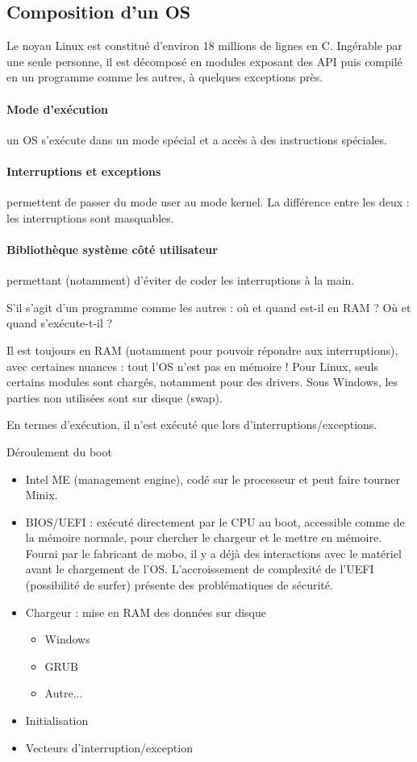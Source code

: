 \documentclass[11pt]{article}
\begin{document}
\subsection{Composition d'un OS}
Le noyau Linux est constitué d'environ 18 millions de lignes en C. Ingérable par une seule personne, il est décomposé en modules exposant des API puis compilé en un programme comme les autres, à quelques exceptions près.

\paragraph{Mode d'exécution} un OS s'exécute dans un mode spécial et a accès à des instructions spéciales. 

\paragraph{Interruptions et exceptions} permettent de passer du mode user au mode kernel. La différence entre les deux : les interruptions sont masquables.

\paragraph{Bibliothèque système côté utilisateur} permettant (notamment) d'éviter de coder les interruptions à la main.

S'il s'agit d'un programme comme les autres : où et quand est-il en RAM ? Où et quand s'exécute-t-il ?

Il est toujours en RAM (notamment pour pouvoir répondre aux interruptions), avec certaines nuances : tout l'OS n'est pas en mémoire ! Pour Linux, seuls certains modules sont chargés, notamment pour des drivers. Sous Windows, les parties non utilisées sont sur disque (swap).

En termes d'exécution, il n'est exécuté que lors d'interruptions/exceptions.

Déroulement du boot
\begin{itemize}
    \item Intel ME (management engine), codé sur le processeur et peut faire tourner Minix.
    \item BIOS/UEFI : exécuté directement par le CPU au boot, accessible comme de la mémoire normale, pour chercher le chargeur et le mettre en mémoire. Fourni par le fabricant de mobo, il y a déjà des interactions avec le matériel avant le chargement de l'OS. L'accroissement de complexité de l'UEFI (possibilité de surfer) présente des problématiques de sécurité.
    \item Chargeur : mise en RAM des données sur disque \begin{itemize}
        \item Windows
        \item GRUB
        \item Autre...
    \end{itemize}
    \item Initialisation
    \item Vecteurs d'interruption/exception
\end{itemize}
\end{document}
